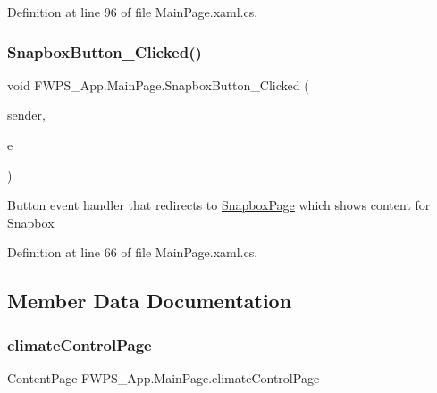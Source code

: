 Definition at line 96 of file Main\+Page.\+xaml.\+cs.

\mbox{\label{class_f_w_p_s___app_1_1_main_page_ab848c0d2c36a990020e6c034ca59a7ee}} 
\subsubsection{\texorpdfstring{Snapbox\+Button\+\_\+\+Clicked()}{SnapboxButton\_Clicked()}}
{\footnotesize\ttfamily void F\+W\+P\+S\+\_\+\+App.\+Main\+Page.\+Snapbox\+Button\+\_\+\+Clicked (\begin{DoxyParamCaption}\item[{object}]{sender,  }\item[{Event\+Args}]{e }\end{DoxyParamCaption})\hspace{0.3cm}{\ttfamily [private]}}

Button event handler that redirects to \mbox{\hyperlink{class_f_w_p_s___app_1_1_snapbox_page}{Snapbox\+Page}} which shows content for Snapbox 

Definition at line 66 of file Main\+Page.\+xaml.\+cs.



\subsection{Member Data Documentation}
\mbox{\label{class_f_w_p_s___app_1_1_main_page_add7db8fcb6edb720574de690540bc827}} 
\subsubsection{\texorpdfstring{climate\+Control\+Page}{climateControlPage}}
{\footnotesize\ttfamily Content\+Page F\+W\+P\+S\+\_\+\+App.\+Main\+Page.\+climate\+Control\+Page\hspace{0.3cm}{\ttfamily [private]}}



